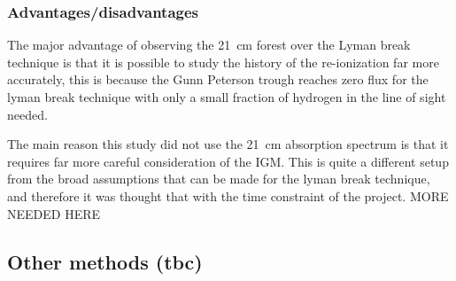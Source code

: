         \subsubsection{Advantages/disadvantages} %
    	\label{subsub:Advantages_disadvantages_21cm}
            The major advantage of observing the \SI{21}{\centi\metre} forest over the Lyman break technique is that it is possible to study the history of the re-ionization far more accurately, this is because the Gunn Peterson trough reaches zero flux for the lyman break technique with only a small fraction of hydrogen in the line of sight needed.

            The main reason this study did not use the \SI{21}{\centi\metre} absorption spectrum is that it requires far more careful consideration of the IGM. This is quite a different setup from the broad assumptions that can be made for the lyman break technique, and therefore it was thought that with the time constraint of the project. MORE NEEDED HERE


    \subsection{Other methods (tbc)} %
    \label{sub:Other_Methods_Reionization}


